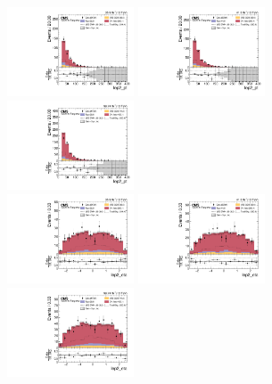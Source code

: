 \begin{figure}[!ht]
  \centering
  \includegraphics[width=0.335\textwidth]{analysis_plots/2016_zv/cr_vjets_m/lep2_pt.pdf} \hspace{-10pt}
  \includegraphics[width=0.335\textwidth]{analysis_plots/2017_zv/cr_vjets_m/lep2_pt.pdf} \hspace{-10pt}
  \includegraphics[width=0.335\textwidth]{analysis_plots/2018_zv/cr_vjets_m/lep2_pt.pdf} \hspace{-10pt} \\
  \includegraphics[width=0.335\textwidth]{analysis_plots/2016_zv/cr_vjets_m/lep2_eta.pdf} \hspace{-10pt}
  \includegraphics[width=0.335\textwidth]{analysis_plots/2017_zv/cr_vjets_m/lep2_eta.pdf} \hspace{-10pt}
  \includegraphics[width=0.335\textwidth]{analysis_plots/2018_zv/cr_vjets_m/lep2_eta.pdf} \hspace{-10pt} \\

\end{figure}
